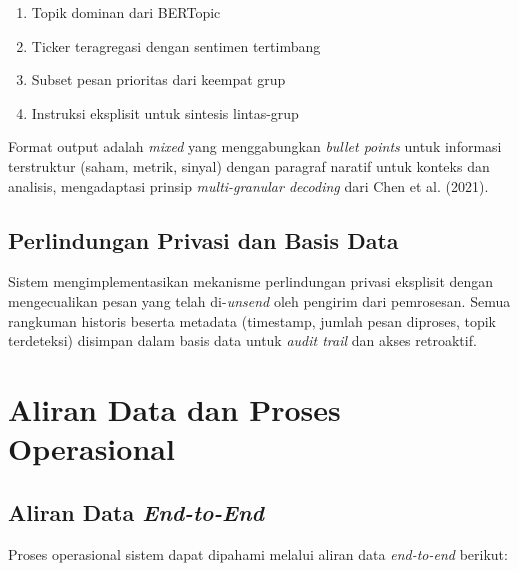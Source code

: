 \begin{enumerate}
\item Topik dominan dari BERTopic
\item Ticker teragregasi dengan sentimen tertimbang
\item Subset pesan prioritas dari keempat grup
\item Instruksi eksplisit untuk sintesis lintas-grup
\end{enumerate}

Format output adalah \textit{mixed} yang menggabungkan \textit{bullet points} untuk informasi terstruktur (saham, metrik, sinyal) dengan paragraf naratif untuk konteks dan analisis, mengadaptasi prinsip \textit{multi-granular decoding} dari Chen et al. (2021).

\subsection{Perlindungan Privasi dan Basis Data}

Sistem mengimplementasikan mekanisme perlindungan privasi eksplisit dengan mengecualikan pesan yang telah di-\textit{unsend} oleh pengirim dari pemrosesan. Semua rangkuman historis beserta metadata (timestamp, jumlah pesan diproses, topik terdeteksi) disimpan dalam basis data untuk \textit{audit trail} dan akses retroaktif.

\section{Aliran Data dan Proses Operasional}
\label{sec:data-flow}

\subsection{Aliran Data \textit{End-to-End}}

Proses operasional sistem dapat dipahami melalui aliran data \textit{end-to-end} berikut:

